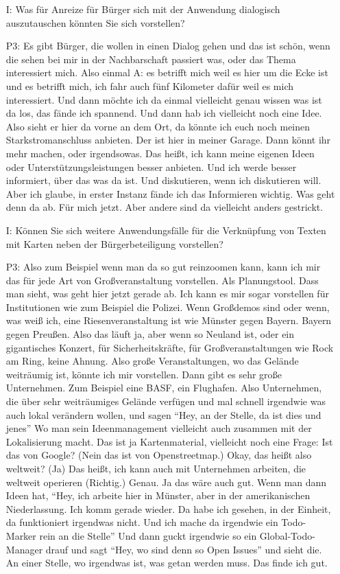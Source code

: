 \begin{itemize}
    \item[I:] Was f{\"u}r Anreize f{\"u}r B{\"u}rger sich mit der Anwendung dialogisch auszutauschen k{\"o}nnten Sie sich vorstellen?
    \item[P3:] Es gibt B{\"u}rger, die wollen in einen Dialog gehen und das ist sch{\"o}n, wenn die sehen bei mir in der Nachbarschaft passiert was, oder das Thema interessiert mich. Also einmal A: es betrifft mich weil es hier um die Ecke ist und es betrifft mich, ich fahr auch f{\"u}nf Kilometer daf{\"u}r weil es mich interessiert. Und dann m{\"o}chte ich da einmal vielleicht genau wissen was ist da los, das f{\"a}nde ich spannend. Und dann hab ich vielleicht noch eine Idee. Also sieht er hier da vorne an dem Ort, da k{\"o}nnte ich euch noch meinen Starkstromanschluss anbieten. Der ist hier in meiner Garage. Dann k{\"o}nnt ihr mehr machen, oder irgendsowas. Das hei{\ss}t, ich kann meine eigenen Ideen oder Unterst{\"u}tzungsleistungen besser anbieten. Und ich werde besser informiert, {\"u}ber das was da ist. Und diskutieren, wenn ich diskutieren will. Aber ich glaube, in erster Instanz f{\"a}nde ich das Informieren wichtig. Was geht denn da ab. F{\"u}r mich jetzt. Aber andere sind da vielleicht anders gestrickt.
    \item[I:] K{\"o}nnen Sie sich weitere Anwendungsf{\"a}lle f{\"u}r die Verkn{\"u}pfung von Texten mit Karten neben der B{\"u}rgerbeteiligung vorstellen?
    \item[P3:] Also zum Beispiel wenn man da so gut reinzoomen kann, kann ich mir das f{\"u}r jede Art von Gro{\ss}veranstaltung vorstellen. Als Planungstool. Dass man sieht, was geht hier jetzt gerade ab. Ich kann es mir sogar vorstellen f{\"u}r Institutionen wie zum Beispiel die Polizei. Wenn Gro{\ss}demos sind oder wenn, was wei{\ss} ich, eine Riesenveranstaltung ist wie M{\"u}nster gegen Bayern. Bayern gegen Preu{\ss}en. Also das l{\"a}uft ja, aber wenn so Neuland ist, oder ein gigantisches Konzert, f{\"u}r Sicherheitskr{\"a}fte, f{\"u}r Gro{\ss}veranstaltungen wie Rock am Ring, keine Ahnung. Also gro{\ss}e Veranstaltungen, wo das Gel{\"a}nde weitr{\"a}umig ist, k{\"o}nnte ich mir vorstellen. Dann gibt es sehr gro{\ss}e Unternehmen. Zum Beispiel eine BASF, ein Flughafen. Also Unternehmen, die {\"u}ber sehr weitr{\"a}umiges Gel{\"a}nde verf{\"u}gen und mal schnell irgendwie was auch lokal ver{\"a}ndern wollen, und sagen "`Hey, an der Stelle, da ist dies und jenes"' Wo man sein Ideenmanagement vielleicht auch zusammen mit der Lokalisierung macht. Das ist ja Kartenmaterial, vielleicht noch eine Frage: Ist das von Google? (Nein das ist von Openstreetmap.) Okay, das hei{\ss}t also weltweit? (Ja) Das hei{\ss}t, ich kann auch mit Unternehmen arbeiten, die weltweit operieren (Richtig.) Genau. Ja das w{\"a}re auch gut. Wenn man dann Ideen hat, "`Hey, ich arbeite hier in M{\"u}nster, aber in der amerikanischen Niederlassung. Ich komm gerade wieder. Da habe ich gesehen, in der Einheit, da funktioniert irgendwas nicht. Und ich mache da irgendwie ein Todo-Marker rein an die Stelle"' Und dann guckt irgendwie so ein Global-Todo-Manager drauf und sagt "`Hey, wo sind denn so Open Issues"' und sieht die. An einer Stelle, wo irgendwas ist, was getan werden muss. Das finde ich gut.

\end{itemize}
